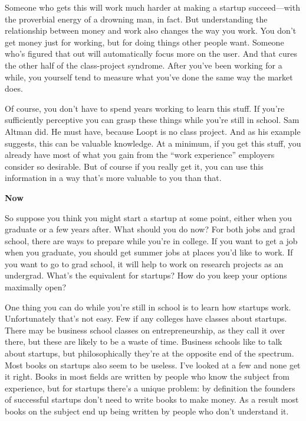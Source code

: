 \documentclass[12pt]{book}
\begin{document}
Someone who gets this will work much harder at making a startup
succeed---with the proverbial energy of a drowning man, in fact. But
understanding the relationship between money and work also changes the
way you work. You don't get money just for working, but for doing things
other people want. Someone who's figured that out will automatically
focus more on the user. And that cures the other half of the
class-project syndrome. After you've been working for a while, you
yourself tend to measure what you've done the same way the market does.

Of course, you don't have to spend years working to learn this stuff. If
you're sufficiently perceptive you can grasp these things while you're
still in school. Sam Altman did. He must have, because Loopt is no class
project. And as his example suggests, this can be valuable knowledge. At
a minimum, if you get this stuff, you already have most of what you gain
from the ``work experience'' employers consider so desirable. But of
course if you really get it, you can use this information in a way
that's more valuable to you than that.

\textbf{Now}

So suppose you think you might start a startup at some point, either
when you graduate or a few years after. What should you do now? For both
jobs and grad school, there are ways to prepare while you're in college.
If you want to get a job when you graduate, you should get summer jobs
at places you'd like to work. If you want to go to grad school, it will
help to work on research projects as an undergrad. What's the equivalent
for startups? How do you keep your options maximally open?

One thing you can do while you're still in school is to learn how
startups work. Unfortunately that's not easy. Few if any colleges have
classes about startups. There may be business school classes on
entrepreneurship, as they call it over there, but these are likely to be
a waste of time. Business schools like to talk about startups, but
philosophically they're at the opposite end of the spectrum. Most books
on startups also seem to be useless. I've looked at a few and none get
it right. Books in most fields are written by people who know the
subject from experience, but for startups there's a unique problem: by
definition the founders of successful startups don't need to write books
to make money. As a result most books on the subject end up being
written by people who don't understand it.
\end{document}
